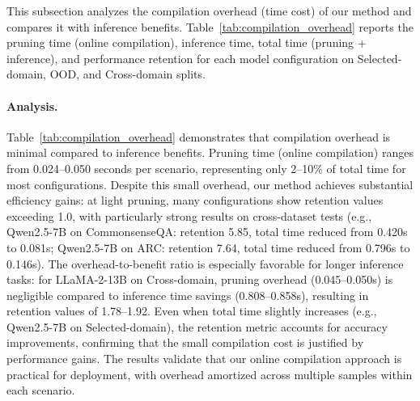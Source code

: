 This subsection analyzes the compilation overhead (time cost) of our method and compares it with inference benefits.
Table~\ref{tab:compilation_overhead} reports the pruning time (online compilation), inference time, total time (pruning + inference), and performance retention for each model configuration on Selected-domain, OOD, and Cross-domain splits.

\paragraph{Analysis.}
Table~\ref{tab:compilation_overhead} demonstrates that compilation overhead is minimal compared to inference benefits. Pruning time (online compilation) ranges from 0.024--0.050 seconds per scenario, representing only 2--10\% of total time for most configurations. Despite this small overhead, our method achieves substantial efficiency gains: at light pruning, many configurations show retention values exceeding 1.0, with particularly strong results on cross-dataset tests (e.g., Qwen2.5-7B on CommonsenseQA: retention 5.85, total time reduced from 0.420s to 0.081s; Qwen2.5-7B on ARC: retention 7.64, total time reduced from 0.796s to 0.146s). The overhead-to-benefit ratio is especially favorable for longer inference tasks: for LLaMA-2-13B on Cross-domain, pruning overhead (0.045--0.050s) is negligible compared to inference time savings (0.808--0.858s), resulting in retention values of 1.78--1.92. Even when total time slightly increases (e.g., Qwen2.5-7B on Selected-domain), the retention metric accounts for accuracy improvements, confirming that the small compilation cost is justified by performance gains. The results validate that our online compilation approach is practical for deployment, with overhead amortized across multiple samples within each scenario.

